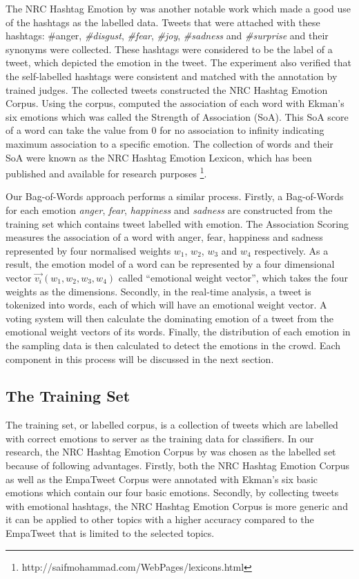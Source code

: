 The NRC Hashtag Emotion by \citep{mohammad2014using} was another notable work which made a good use of the hashtags as the labelled data. Tweets that were attached with these hashtags: \#anger, \textit{\#disgust}, \textit{\#fear}, \textit{\#joy}, \textit{\#sadness} and \textit{\#surprise} and their synonyms were collected. These hashtags were considered to be the label of a tweet, which depicted the emotion in the tweet. The experiment also verified that the self-labelled hashtags were consistent and matched with the annotation by trained judges. The collected tweets constructed the NRC Hashtag Emotion Corpus. Using the corpus, \citet{mohammad2014using} computed the association of each word with Ekman's six emotions which was called the Strength of Association (SoA). This SoA score of a word can take the value from 0 for no association to infinity indicating maximum association to a specific emotion. The collection of words and their SoA were known as the NRC Hashtag Emotion Lexicon, which has been published and available for research purposes \footnote{http://saifmohammad.com/WebPages/lexicons.html}.

Our Bag-of-Words approach performs a similar process. Firstly, a Bag-of-Words for each emotion \textit{anger}, \textit{fear}, \textit{happiness} and \textit{sadness} are constructed from the training set which contains tweet labelled with emotion. The Association Scoring measures the association of a word with anger, fear, happiness and sadness represented by four normalised weights \(w_1\), \(w_2\), \(w_3\) and \(w_4\) respectively. As a result, the emotion model of a word can be represented by a four dimensional vector \(\vec{v_i}(w_1, w_2, w_3, w_4)\) called ``emotional weight vector'', which takes the four weights as the dimensions. Secondly, in the real-time analysis, a tweet is tokenized into words, each of which will have an emotional weight vector. A voting system will then calculate the dominating emotion of a tweet from the emotional weight vectors of its words. Finally, the distribution of each emotion in the sampling data is then calculated to detect the emotions in the crowd. Each component in this process will be discussed in the next section.

\subsection{The Training Set}
The training set, or labelled corpus, is a collection of tweets which are labelled with correct emotions to server as the training data for classifiers. In our research, the NRC Hashtag Emotion Corpus by \citet{mohammad2014using} was chosen as the labelled set because of following advantages. Firstly, both the NRC Hashtag Emotion Corpus as well as the EmpaTweet Corpus were annotated with Ekman's six basic emotions which contain our four basic emotions. Secondly, by collecting tweets with emotional hashtags, the NRC Hashtag Emotion Corpus is more generic and it can be applied to other topics with a higher accuracy compared to the EmpaTweet that is limited to the selected topics.


